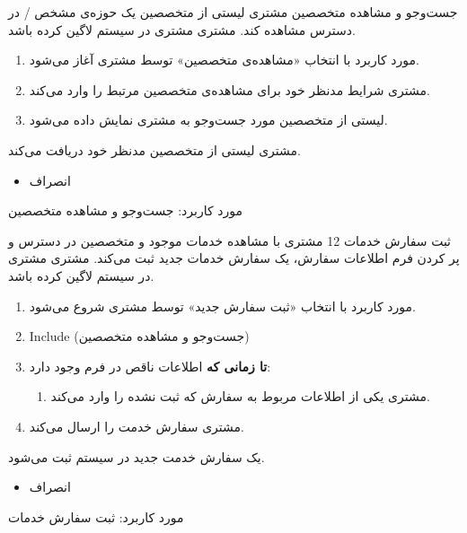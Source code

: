 

\usecase
{جست‌وجو و مشاهده متخصصین}
{}
{
	مشتری لیستی از متخصصین یک حوزه‌ی مشخص / در دسترس مشاهده کند.
}
{مشتری}
{}
{
	مشتری در سیستم لاگین کرده باشد.
}
{
	\vspace*{-0.6cm}
	\begin{enumerate}
		\item 
		مورد کاربرد با انتخاب «مشاهده‌ی متخصصین» توسط مشتری آغاز می‌شود.
		\item 
		مشتری شرایط مدنظر خود برای مشاهده‌ی متخصصین مرتبط را وارد می‌کند.
		\item 
		لیستی از متخصصین مورد جست‌وجو به مشتری نمایش داده می‌شود.
	\end{enumerate}
}
{مشتری لیستی از متخصصین مدنظر خود دریافت می‌کند.}
{
	\begin{itemize}
		\vspace*{-0.6cm}
		\item انصراف
	\end{itemize}
}
{
	مورد کاربرد: جست‌وجو و مشاهده متخصصین
}

\usecase
{ثبت سفارش خدمات}
{12}
{
	مشتری با مشاهده خدمات موجود و متخصصین در دسترس و پر کردن فرم اطلاعات سفارش، یک سفارش خدمات جدید ثبت می‌کند.
}
{مشتری}
{}
{
	مشتری در سیستم لاگین کرده باشد.
}
{
	\vspace*{-0.6cm}
	\begin{enumerate}
		\item 
		مورد کاربرد با انتخاب «ثبت سفارش جدید» توسط مشتری شروع می‌شود.
		\item 
		Include (جست‌وجو و مشاهده متخصصین)
		\item 
		\textbf{تا زمانی که}
		اطلاعات ناقص در فرم وجود دارد:
		\begin{enumerate}[label=\theenumi.\arabic*.]
			\item 
			مشتری یکی از اطلاعات مربوط به سفارش که ثبت نشده را وارد می‌کند.
		\end{enumerate}
		\item 
		مشتری سفارش خدمت را ارسال می‌کند.
		
	\end{enumerate}
}
{یک سفارش خدمت جدید در سیستم ثبت می‌شود.}
{
	\begin{itemize}
		\vspace*{-0.6cm}
		\item انصراف
	\end{itemize}
}
{
	مورد کاربرد: ثبت سفارش خدمات
}

